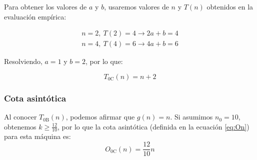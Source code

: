 Para obtener los valores de $a$ y $b$, usaremos valores de $n$ y $T(n)$ obtenidos en la evaluación empírica:

\begin{subequations}
    \begin{gather}
        n = 2,\ T(2) = 4 \rightarrow 2a + b = 4 \\
        n = 4,\ T(4) = 6 \rightarrow 4a + b = 6
    \end{gather}
\end{subequations}

Resolviendo, $a = 1$ y $b=2$, por lo que:

\begin{equation}
    T_{\mathrm{0C}}(n) = n + 2
\end{equation}


\subsubsection*{Cota asintótica}
Al conocer $T_{\mathrm{0B}}(n)$, podemos afirmar que $g(n) = n$. Si asumimos $n_0 = 10$, obtenemos $k \geq \frac{12}{10}$, por lo que la cota asintótica (definida en la ecuación \ref{eq:On}) para esta máquina es:
\begin{equation}
    O_{\mathrm{0C}}(n) = \frac{12}{10} n
\end{equation}

